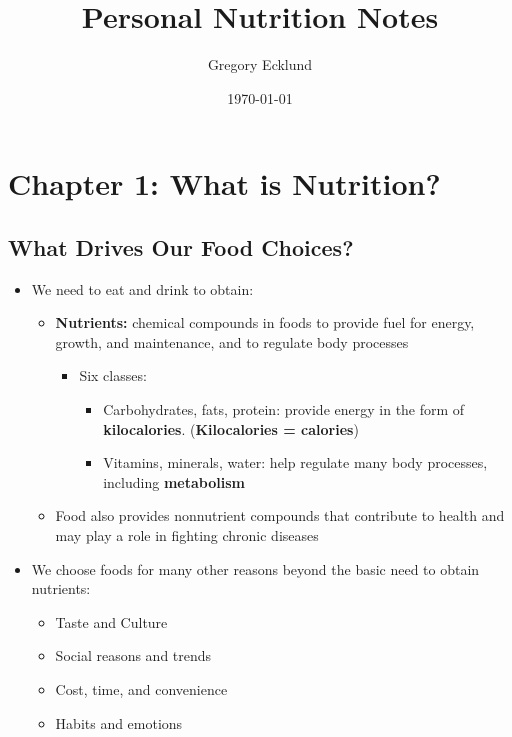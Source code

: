 \documentclass[12pt]{article}
\title{Personal Nutrition Notes}
\author{Gregory Ecklund}
\date{\today}
\begin{document}
    \maketitle
    \tableofcontents
    \newpage
    
    \section{Chapter 1: What is Nutrition?}

        \subsection{What Drives Our Food Choices?}
            \begin{itemize}
                \item We need to eat and drink to obtain:
                \begin{itemize}
                    \item \textbf{Nutrients:} chemical compounds in foods to provide fuel for energy, growth, and maintenance, and to regulate body processes
                        \begin{itemize}
                            \item Six classes:
                                \begin{itemize}
                                    \item Carbohydrates, fats, protein: provide energy in the form of \textbf{kilocalories}. (\textbf{Kilocalories = calories})
                                    \item Vitamins, minerals, water: help regulate many body processes, including \textbf{metabolism}
                                \end{itemize}
                        \end{itemize}
                    \item Food also provides nonnutrient compounds that contribute to health and may play a role in fighting chronic diseases
                \end{itemize}
                \item We choose foods for many other reasons beyond the basic need to obtain nutrients:
                    \begin{itemize}
                        \item Taste and Culture
                        \item Social reasons and trends
                        \item Cost, time, and convenience
                        \item Habits and emotions
                    \end{itemize}
            \end{itemize}
\end{document}
